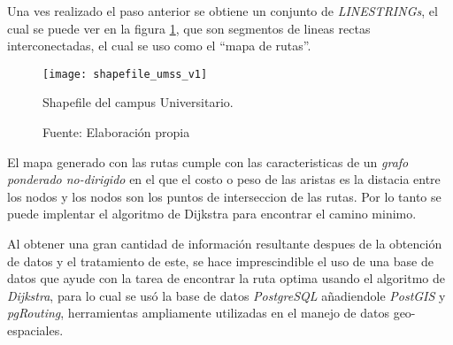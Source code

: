Una ves realizado el paso anterior se obtiene un conjunto de \emph{LINESTRINGs}, el cual se puede ver en la figura \ref{fig:shapefile_umss_v1}, que son segmentos de lineas rectas interconectadas, el cual se uso como el  ``mapa de rutas''.







 \begin{figure}[H]
   \begin{center}
     \texttt{[image: shapefile\_umss\_v1]}
     \caption{Shapefile del campus Universitario.}
     \label{fig:shapefile_umss_v1}
     \caption*{Fuente: Elaboración propia}
   \end{center}
 \end{figure}


El mapa generado con las rutas cumple con las caracteristicas de un \emph{grafo ponderado no-dirigido} en el que el costo o peso de las aristas es la distacia entre los nodos y los nodos son los puntos de interseccion de las rutas. Por lo tanto se puede implentar el algoritmo de Dijkstra para encontrar el camino minimo.

Al obtener una gran cantidad de información resultante despues de la obtención de datos y el tratamiento de este, se hace imprescindible el uso de una base de datos que ayude con la tarea de encontrar la ruta optima usando el algoritmo de \emph{Dijkstra}, para lo cual se usó la base de datos \emph{PostgreSQL} añadiendole \emph{PostGIS} y \emph{pgRouting}, herramientas ampliamente utilizadas en el manejo de datos geo-espaciales.\\



